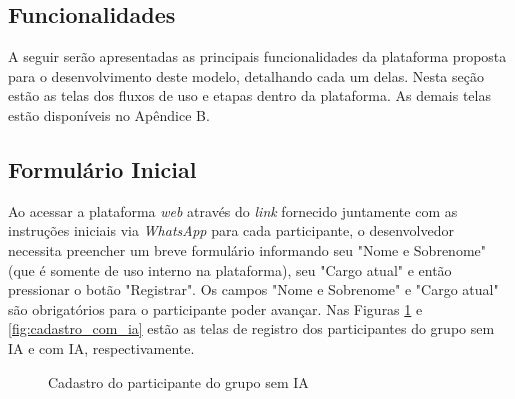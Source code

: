 \documentclass[english,brazilian]{UNISINOSartigo} %
\begin{document}
\subsection{Funcionalidades}

A seguir serão apresentadas as principais funcionalidades da plataforma proposta para o desenvolvimento deste modelo, detalhando cada um delas. Nesta seção estão as telas dos fluxos  de uso e etapas dentro da plataforma. As demais telas estão disponíveis no Apêndice B.

\subsection{Formulário Inicial}

Ao acessar a plataforma \textit{web} através do \textit{link} fornecido juntamente com as instruções iniciais via \textit{WhatsApp} para cada participante, o desenvolvedor necessita preencher um breve formulário informando seu "Nome e Sobrenome" (que é somente de uso interno na plataforma), seu "Cargo atual" e então pressionar o botão "Registrar". Os campos "Nome e Sobrenome" e "Cargo atual" são obrigatórios para o participante poder avançar. Nas Figuras \ref{fig:cadastro_sem_ia} e \ref{fig:cadastro_com_ia} estão as telas de registro dos participantes do grupo sem IA e com IA, respectivamente.

\begin{figure}[ht]
    \caption{Cadastro do participante do grupo sem IA}
    \label{fig:cadastro_sem_ia}
    \centering
    \footnotesize
    \begin{minipage}{.9\textwidth}
        \centering
    \end{minipage}
\end{figure}
\FloatBarrier
\end{document}
